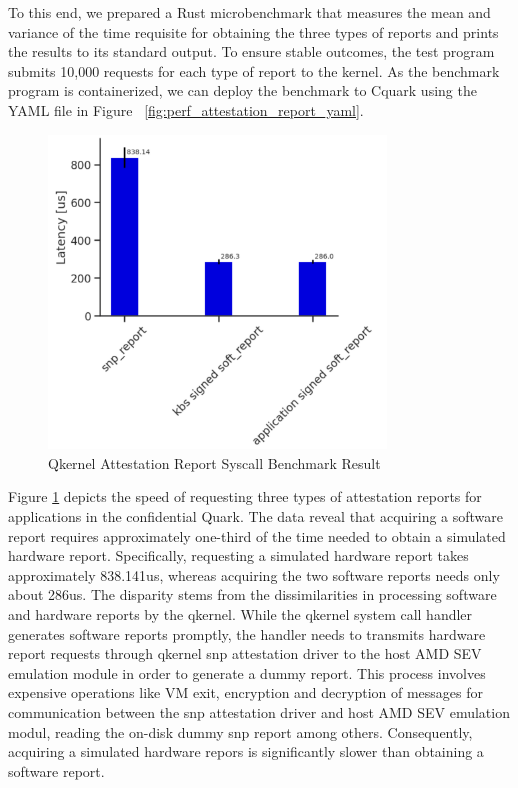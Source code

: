 To this end, we prepared a Rust microbenchmark \cite*{benchamark_Attestation_Report_Syscall} that measures the mean and variance of the time requisite for obtaining the three types of reports and prints the results to its standard output. To ensure stable outcomes, the test program submits 10,000 requests for each type of report to the kernel. 
As the benchmark program is containerized, we can deploy the benchmark to Cquark using the YAML file in Figure ~\ref{fig:perf_attestation_report_yaml}.

\begin{figure}[H]
    \centering
    \includegraphics[width=0.8\textwidth]{images/perf_attestation_report_result.PNG}
    \caption[Benchmark result of Attestation Report Syscall]{Qkernel Attestation Report Syscall Benchmark Result}
    \label{fig:perf_attestation_report_result}
\end{figure}

Figure \ref{fig:perf_attestation_report_result} depicts the speed of requesting three types of attestation reports for  applications in the confidential Quark. The data reveal that acquiring a software report requires approximately one-third of the time needed to obtain a simulated hardware report. 
Specifically, requesting a simulated hardware report takes approximately 838.141us, whereas acquiring the two software reports needs only about 286us. The disparity stems from the dissimilarities in processing software and hardware reports by the qkernel. While the qkernel 
system call handler generates software reports promptly, the handler needs to transmits hardware report requests through qkernel snp attestation driver to the host AMD SEV emulation module in order to generate a dummy report. This process involves expensive operations like VM exit, 
encryption and decryption of messages for communication between the snp attestation driver and host AMD SEV emulation modul, reading the on-disk dummy snp report among others. Consequently, acquiring a simulated hardware repors is significantly slower than obtaining a software report.


